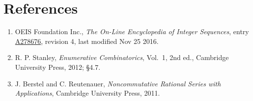 \documentclass[11pt]{article}
\theoremstyle{definition}
\begin{document}
\section{References}

\begin{enumerate}

\item OEIS Foundation Inc., \emph{The On-Line Encyclopedia of Integer Sequences}, entry \href{https://oeis.org/A278676}{A278676}, revision 4, last modified Nov 25 2016.

\item R. P. Stanley, \emph{Enumerative Combinatorics}, Vol.~1, 2nd ed., Cambridge University Press, 2012; \S4.7.

\item J. Berstel and C. Reutenauer, \emph{Noncommutative Rational Series with Applications}, Cambridge University Press, 2011.

\end{enumerate}
\end{document}
